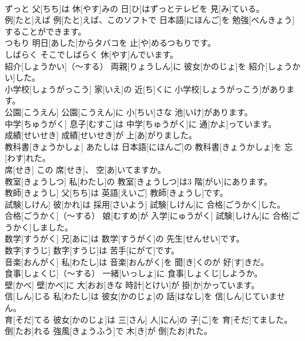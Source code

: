 \documentclass[8pt]{extreport}
\begin{document}
\begin{CJK}{UTF8}{min}
\\	ずっと	父[ちち]は 休[やす]みの 日[ひ]はずっとテレビを 見[み]ている。		
\\	例[たと]えば	例[たと]えば、このソフトで 日本語[にほんご]を 勉強[べんきょう]することができます。		
\\	つもり	明日[あした]からタバコを 止[や]めるつもりです。		
\\	しばらく	そこでしばらく 休[やす]んでいます。		
\\	紹介[しょうかい]（～する）	両親[りょうしん]に 彼女[かのじょ]を 紹介[しょうかい]した。		
\\	小学校[しょうがっこう]	家[いえ]の 近[ち]くに 小学校[しょうがっこう]があります。		
\\	公園[こうえん]	公園[こうえん]に 小[ちい]さな 池[いけ]があります。		
\\	中学[ちゅうがく]	息子[むすこ]は 中学[ちゅうがく]に 通[かよ]っています。		
\\	成績[せいせき]	成績[せいせき]が 上[あ]がりました。		
\\	教科書[きょうかしょ]	あたしは 日本語[にほんご]の 教科書[きょうかしょ]を 忘[わす]れた。		
\\	席[せき]	この 席[せき]、 空[あ]いてますか。		
\\	教室[きょうしつ]	私[わたし]の 教室[きょうしつ]は3 階[がい]にあります。		
\\	教師[きょうし]	父[ちち]は 英語[えいご] 教師[きょうし]です。		
\\	試験[しけん]	彼[かれ]は 採用[さいよう] 試験[しけん]に 合格[ごうかく]した。		
\\	合格[ごうかく]（～する）	娘[むすめ]が 入学[にゅうがく] 試験[しけん]に 合格[ごうかく]しました。		
\\	数学[すうがく]	兄[あに]は 数学[すうがく]の 先生[せんせい]です。		
\\	数字[すうじ]	数字[すうじ]は 苦手[にがて]です。		
\\	音楽[おんがく]	私[わたし]は 音楽[おんがく]を 聞[き]くのが 好[す]きだ。		
\\	食事[しょくじ]（～する）	一緒[いっしょ]に 食事[しょくじ]しようか。		
\\	壁[かべ]	壁[かべ]に 大[おお]きな 時計[とけい]が 掛[か]かっています。		
\\	信[しん]じる	私[わたし]は 彼女[かのじょ]の 話[はなし]を 信[しん]じていません。		
\\	育[そだ]てる	彼女[かのじょ]は 三[さん] 人[にん]の 子[こ]を 育[そだ]てました。		
\\	倒[たお]れる	強風[きょうふう]で 木[き]が 倒[たお]れた。		

\end{CJK}
\end{document}
